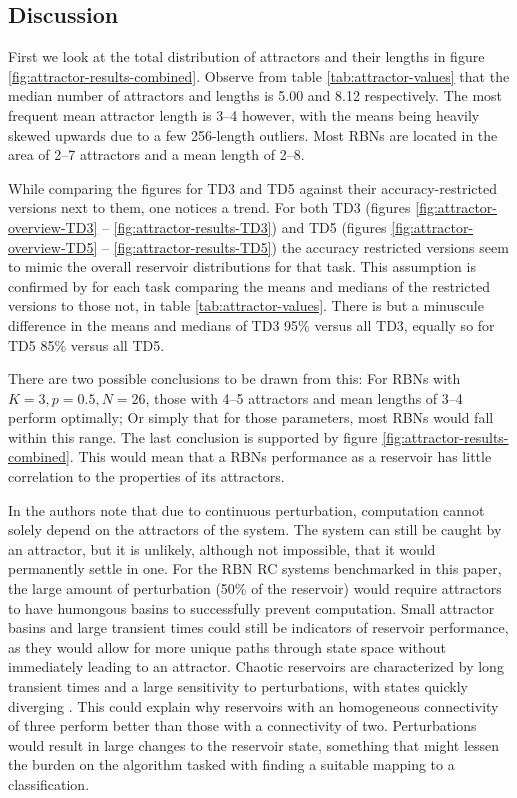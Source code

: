 \subsection{Discussion}

First we look at the total distribution of attractors and their lengths in figure \ref{fig:attractor-results-combined}.
Observe from table \ref{tab:attractor-values} that the median number of attractors and lengths is 5.00 and 8.12 respectively.
The most frequent mean attractor length is 3--4 however,
with the means being heavily skewed upwards due to a few 256-length outliers.
Most RBNs are located in the area of 2--7 attractors and a mean length of 2--8.

While comparing the figures for TD3 and TD5 against their accuracy-restricted versions next to them,
one notices a trend.
For both TD3 (figures \ref{fig:attractor-overview-TD3} -- \ref{fig:attractor-results-TD3}) and TD5 (figures \ref{fig:attractor-overview-TD5} -- \ref{fig:attractor-results-TD5})
the accuracy restricted versions seem to mimic the overall reservoir distributions for that task.
This assumption is confirmed by for each task comparing the means and medians of the restricted versions to those not,
in table \ref{tab:attractor-values}.
There is but a minuscule difference in the means and medians of TD3 95\% versus all TD3,
equally so for TD5 85\% versus all TD5.

There are two possible conclusions to be drawn from this:
For RBNs with $ K=3, p=0.5, N=26 $,
those with 4--5 attractors and mean lengths of 3--4 perform optimally;
Or simply that for those parameters, most RBNs would fall within this range.
The last conclusion is supported by figure \ref{fig:attractor-results-combined}.
This would mean that a RBNs performance as a reservoir has little correlation to the properties of its attractors.

In \cite{rbn-reservoir} the authors note that due to continuous perturbation,
computation cannot solely depend on the attractors of the system.
The system can still be caught by an attractor,
but it is unlikely,
although not impossible,
that it would permanently settle in one.
For the RBN RC systems benchmarked in this paper,
the large amount of perturbation (50\% of the reservoir) would require attractors to have humongous basins to successfully prevent computation.
Small attractor basins and large transient times could still be indicators of reservoir performance,
as they would allow for more unique paths through state space without immediately leading to an attractor.
Chaotic reservoirs are characterized by long transient times and a large sensitivity to perturbations,
with states quickly diverging \cite{gershenson2004introduction}.
This could explain why reservoirs with an homogeneous connectivity of three perform better than those with a connectivity of two.
Perturbations would result in large changes to the reservoir state,
something that might lessen the burden on the algorithm tasked with finding a suitable mapping to a classification.
